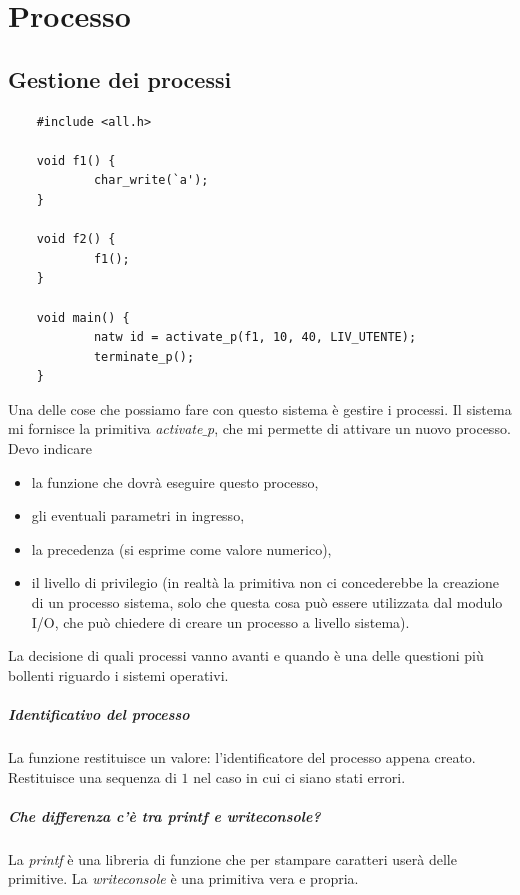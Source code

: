 \documentclass[11pt]{report}
\theoremstyle{definition}
\begin{document}
\chapter{Processo}

\section{Gestione dei processi}
\small
\begin{verbatim}
	#include <all.h>
	
	void f1() {
		    char_write(`a');
	}
	
	void f2() {
		    f1();
	}
	
	void main() {
		    natw id = activate_p(f1, 10, 40, LIV_UTENTE);
		    terminate_p();
	}
\end{verbatim}
\normalsize
Una delle cose che possiamo fare con questo sistema è gestire i processi.  Il sistema mi fornisce la primitiva \emph{activate$\_$p}, che mi permette di attivare un nuovo processo. Devo indicare
\begin{itemize}
	\item la funzione che dovrà eseguire questo processo,
	\item gli eventuali parametri in ingresso,
	\item la precedenza (si esprime come valore numerico),
	\item il livello di privilegio (in realtà la primitiva non ci concederebbe la creazione di un processo sistema, solo che questa cosa può essere utilizzata dal modulo I/O, che può chiedere di creare un processo a livello sistema).
\end{itemize}
La decisione di quali processi vanno avanti e quando è una delle questioni più bollenti riguardo i sistemi operativi. 
\paragraph{Identificativo del processo} La funzione restituisce un valore: l'identificatore del processo appena creato. Restituisce una sequenza di $1$ nel caso in cui ci siano stati errori.

\paragraph{Che differenza c'è tra \emph{printf} e \emph{writeconsole}?} La \emph{printf} è una libreria di funzione che per stampare caratteri userà delle primitive. La \emph{writeconsole} è una primitiva vera e propria.
\end{document}
